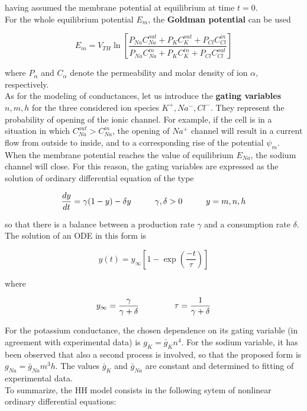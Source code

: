 \documentclass[12pt, a4paper]{report}
\begin{document}
having assumed the membrane potential at equilibrium at time $t=0$.\\
For the whole equilibrium potential $E_m$, the \textbf{Goldman potential} can be used \cite{38}%


\begin{equation}
E_m= V_{TH} \ln \left[\frac{P_{Na} C_{Na}^{out} + P_{K} C_K^{out} + P_{Cl} C_{Cl}^{in}}{P_{Na} C_{Na}^{in} + P_{K} C_K^{in} + P_{Cl} C_{Cl}^{out}}\right]
\end{equation}

where $P_\alpha$ and $C_\alpha$  denote the permeability and molar density of ion $\alpha$, respectively.\\
As for the modeling of conductances, let us introduce the \textbf{gating variables} $n,m,h$ for the three considered ion species $K^+,Na^-,Cl^-$. They represent the probability of opening of the ionic channel. For example, if the cell is in a situation in which $C_{Na}^{out} > C_{Na}^{in}$, the opening of $Na^+$ channel will result in a current flow from outside to inside, and to a corresponding rise of the potential $\psi_m$. When the membrane potential reaches the value of equilibrium $E_{Na}$, the sodium channel will close. For this reason, the gating variables are expressed as the solution of ordinary differential equation of the type

\begin{equation}
\frac{dy}{dt} = \gamma (1-y) - \delta y \hspace{1 cm} \gamma,\delta >0  \hspace{1 cm} y = m,n,h
\end{equation}

so that there is a balance between a production rate $\gamma$ and a consumption rate $\delta$. The solution of an ODE in this form is

\begin{equation}
y(t) = y_\infty \left[1 - \exp\left(\frac{-t}{\tau}\right)\right]
\end{equation}

where

\begin{equation}
y_\infty = \frac{\gamma}{\gamma + \delta} \hspace{1.5cm} \tau = \frac{1}{\gamma + \delta}
\end{equation}

For the potassium conductance, the chosen dependence on its gating variable (in agreement with experimental data) is $ g_K = \bar{g}_K n^4$. For the sodium variable, it has been observed that also a second process is involved, so that the proposed form is  $ g_{Na} = \bar{g}_{Na} m^3h$. The values $\bar{g}_K$ and $\bar{g}_{Na}$ are constant and determined to fitting of experimental data.\\
To summarize, the HH model consists in the following sytem of nonlinear ordinary differential equations:
\end{document}
